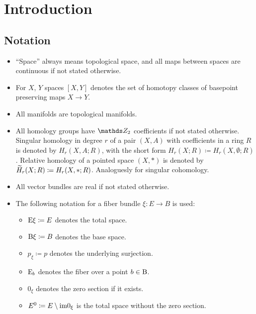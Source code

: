 % 

\chapter*{Introduction}

\section*{Notation}
\begin{itemize}
\item \enquote{Space} always means topological space, and all maps
  between spaces are continuous if not stated otherwise.
\item For $X$, $Y$ spaces $[X,Y]$ denotes the set of homotopy classes
  of basepoint preserving maps $X\to Y$.
\item All manifolds are topological manifolds.
\item All homology groups have $\Zmod2$ coefficients if not stated
  otherwise. Singular homology in degree $r$ of a pair $(X,A)$ with
  coefficients in a ring $R$ is denoted by $H_r(X,A;R)$, with the
  short form $H_r(X;R)\coloneqq H_r(X,\emptyset;R)$. Relative homology
  of a pointed space $(X,\ast)$ is denoted by $\widetilde{H}_r(X;R)\coloneqq
  H_r(X,\ast;R)$. Analoguesly for singular cohomology.
\item All vector bundles are real if not stated otherwise.
\item The following notation for a fiber bundle $\xi\colon E\to B$ is used:
  \begin{itemize}
  \item $\mathrm{E}\xi\coloneqq E$ denotes the total space.
  \item $\mathrm{B}\xi\coloneqq B$ denotes the base space.
  \item $p_\xi\coloneqq p$ denotes the underlying surjection.
  \item $\mathrm{E}_b$ denotes the fiber over a point $b\in \B$.
  \item $0_\xi$ denotes the zero section if it exists.
  \item ${E}^0\coloneqq E\setminus\mathrm{im}0_{\xi}$
    is the total space without the zero section.

\end{itemize}
\end{itemize}
